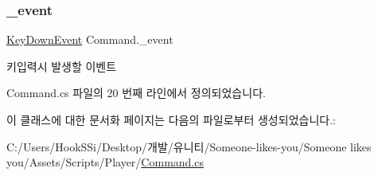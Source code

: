 \subsubsection{\texorpdfstring{\_event}{\_event}}
{\footnotesize\ttfamily \mbox{\hyperlink{class_command_acc714b5e0de57b7f24b2619fff860b9d}{Key\+Down\+Event}} Command.\+\_\+event}



키입력시 발생할 이벤트 



Command.\+cs 파일의 20 번째 라인에서 정의되었습니다.



이 클래스에 대한 문서화 페이지는 다음의 파일로부터 생성되었습니다.\+:\begin{DoxyCompactItemize}
\item 
C\+:/\+Users/\+Hook\+S\+Si/\+Desktop/개발/유니티/\+Someone-\/likes-\/you/\+Someone likes you/\+Assets/\+Scripts/\+Player/\mbox{\hyperlink{_command_8cs}{Command.\+cs}}\end{DoxyCompactItemize}
